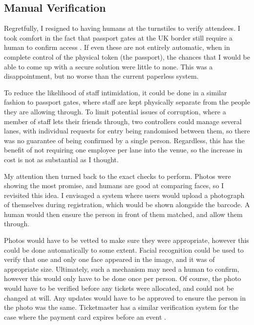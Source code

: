 \documentclass[12pt,a4paper]{bhamdissertation}
\begin{document}
\subsection{Manual Verification}

Regretfully, I resigned to having humans at the turnstiles to verify attendees. I took comfort in the fact that passport gates at the UK border still require a human to confirm access \cite{Ba16}. If even these are not entirely automatic, when in complete control of the physical token (the passport), the chances that I would be able to come up with a secure solution were little to none. This was a disappointment, but no worse than the current paperless system.

To reduce the likelihood of staff intimidation, it could be done in a similar fashion to passport gates, where staff are kept physically separate from the people they are allowing through. To limit potential issues of corruption, where a member of staff lets their friends through, two controllers could manage several lanes, with individual requests for entry being randomised between them, so there was no guarantee of being confirmed by a single person. Regardless, this has the benefit of not requiring one employee per lane into the venue, so the increase in cost is not as substantial as I thought.

My attention then turned back to the exact checks to perform. Photos were showing the most promise, and humans are good at comparing faces, so I revisited this idea. I envisaged a system where users would upload a photograph of themselves during registration, which would be shown alongside the barcode. A human would then ensure the person in front of them matched, and allow them through.

Photos would have to be vetted to make sure they were appropriate, however this could be done automatically to some extent. Facial recognition could be used to verify that one and only one face appeared in the image, and it was of appropriate size. Ultimately, such a mechanism may need a human to confirm, however this would only have to be done once per person. Of course, the photo would have to be verified before any tickets were allocated, and could not be changed at will. Any updates would have to be approved to ensure the person in the photo was the same. Ticketmaster has a similar verification system for the case where the payment card expires before an event \cite{T166}.
\end{document}
